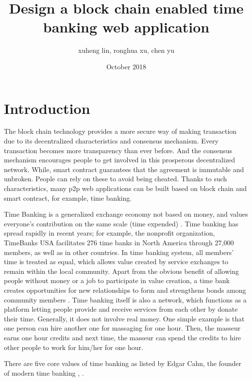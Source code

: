 \documentclass{article}
\title{Design a block chain enabled time banking web application}
\author{xuheng lin, ronghua xu, chen yu }
\date{October 2018}
\begin{document}
\maketitle

\section{Introduction}
The block chain technology provides a more secure way of making transaction due to its decentralized characteristics and consensus mechanism. Every transaction becomes more transparency than ever before. And the consensus mechanism encourages people to get involved in this prosperous decentralized network. While, smart contract guarantees that the agreement is immutable and unbroken. People can rely on these to avoid being cheated. Thanks to such characteristics, many p2p web applications can be built based on block chain and smart contract, for example, time banking. 

Time Banking is a generalized exchange economy not based on money, and values everyone’s contribution on the same scale (time expended) \cite{carroll2013co}. Time banking has spread rapidly in recent years; for example, the nonprofit organization, TimeBanks USA \cite{TimeBanksUSA} facilitates 276 time banks in North America through 27,000 members, as well as in other countries. In time banking system, all members’ time is treated as equal, which allows value created by service exchanges to remain within the local community. Apart from the obvious benefit of allowing people without money or a job to participate in value creation, a time bank creates opportunities for new relationships to form and strengthens bonds among community members \cite{bellotti2014towards}. Time banking itself is also a network, which functions as a platform letting people provide and receive services from each other by donate their time. Generally, it does not involve real money. One simple example is that one person can hire another one for massaging for one hour. Then, the masseur earns one hour credits and next time, the masseur can spend the credits to hire other people to work for him/her for one hour.

There are five core values of time banking as listed by Edgar Cahn, the founder of modern time banking \cite{cahn2011time}, \cite{cahn2000no}.
\end{document}
